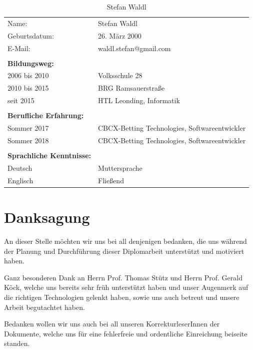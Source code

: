 \begin{table}[htb]
\begin{tabular}{ll}
Name:                            & Stefan Waldl          		 \\
Geburtsdatum:                    & 26. März 2000                 \\
E-Mail:                          & waldl.stefan@gmail.com        \\
                                 &                               \\
\textbf{Bildungsweg:}            &                               \\  
2006 bis 2010                    & Volksschule 28      		     \\
2010 bis 2015                    & BRG Ramsauerstraße    	 	 \\
seit 2015                        & HTL Leonding, Informatik      \\
                                 &                               \\
\textbf{Berufliche Erfahrung:}   &                               \\
Sommer 2017                      & CBCX-Betting Technologies, Softwareentwickler \\
Sommer 2018                      & CBCX-Betting Technologies, Softwareentwickler \\
                                 &                               \\
\textbf{Sprachliche Kenntnisse:} &                               \\
Deutsch                          & Muttersprache                 \\
Englisch                         & Fließend                     
\end{tabular}
\caption{Stefan Waldl}
\end{table}
\pagebreak
 

\section*{Danksagung}

An dieser Stelle möchten wir uns bei all denjenigen bedanken, die uns während der
Planung und Durchführung dieser Diplomarbeit unterstützt und motiviert haben.

Ganz besonderen Dank an Herrn Prof. Thomas Stütz und Herrn Prof. Gerald Köck, welche uns bereits sehr früh unterstützt haben und unser Augenmerk auf die richtigen Technologien gelenkt haben, sowie uns auch betreut und unsere Arbeit begutachtet haben.

Bedanken wollen wir uns auch bei all unseren KorrekturleserInnen der Dokumente, welche
uns für eine fehlerfreie und ordentliche Einreichung beiseite standen.
